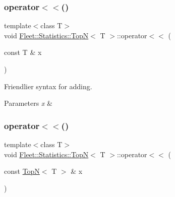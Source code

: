 \mbox{\label{class_fleet_1_1_statistics_1_1_top_n_af54651d8e83bdcc6b3ffbcef3aa3fd6e}} 
\subsubsection{\texorpdfstring{operator$<$$<$()}{operator<<()}\hspace{0.1cm}{\footnotesize\ttfamily [1/2]}}
{\footnotesize\ttfamily template$<$class T$>$ \\
void \hyperlink{class_fleet_1_1_statistics_1_1_top_n}{Fleet\+::\+Statistics\+::\+TopN}$<$ T $>$\+::operator$<$$<$ (\begin{DoxyParamCaption}\item[{const T \&}]{x }\end{DoxyParamCaption})\hspace{0.3cm}{\ttfamily [inline]}}

Friendlier syntax for adding. 
\begin{DoxyParams}{Parameters}
{\em x} & \\
\hline
\end{DoxyParams}
\mbox{\label{class_fleet_1_1_statistics_1_1_top_n_a73cb4911b6dc2bdc56f466ca4b93ef9d}} 
\subsubsection{\texorpdfstring{operator$<$$<$()}{operator<<()}\hspace{0.1cm}{\footnotesize\ttfamily [2/2]}}
{\footnotesize\ttfamily template$<$class T$>$ \\
void \hyperlink{class_fleet_1_1_statistics_1_1_top_n}{Fleet\+::\+Statistics\+::\+TopN}$<$ T $>$\+::operator$<$$<$ (\begin{DoxyParamCaption}\item[{const \hyperlink{class_fleet_1_1_statistics_1_1_top_n}{TopN}$<$ T $>$ \&}]{x }\end{DoxyParamCaption})\hspace{0.3cm}{\ttfamily [inline]}}

